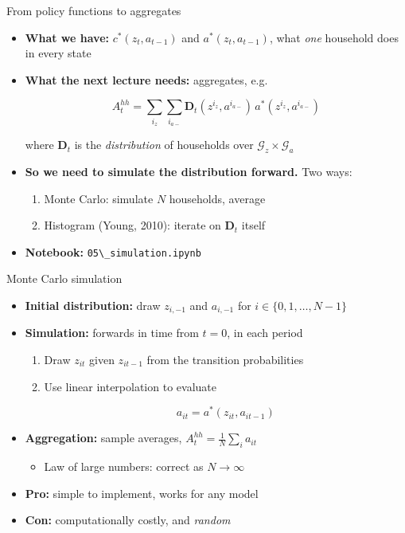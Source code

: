 \documentclass[
  10pt,
  ignorenonframetext,
  aspectratio=43,
  english,
]{beamer}
\providecommand{\tightlist}{%
  \setlength{\itemsep}{0pt}\setlength{\parskip}{0pt}}
\begin{document}
\begin{frame}[fragile]{From policy functions to aggregates}
\protect{}\label{from-policy-functions-to-aggregates}
\begin{itemize}
\item
  \textbf{What we have:} \(c^{\ast}(z_{t},a_{t-1})\) and
  \(a^{\ast}(z_{t},a_{t-1})\), what \emph{one} household does in every
  state
\item
  \textbf{What the next lecture needs:} aggregates, e.g.\vspace{-1mm}

  \[
    A^{hh}_{t}=\sum_{i_{z}}\sum_{i_{a-}}\boldsymbol{D}_{t}(z^{i_{z}},a^{i_{a-}})\,a^{\ast}(z^{i_{z}},a^{i_{a-}})
    \]

  where \(\boldsymbol{D}_{t}\) is the \emph{distribution} of households
  over \(\mathcal{G}_{z}\times\mathcal{G}_{a}\)
\item
  \textbf{So we need to simulate the distribution forward.} Two ways:

  \begin{enumerate}
  \tightlist
  \item
    Monte Carlo: simulate \(N\) households, average
  \item
    Histogram (Young, 2010): iterate on \(\boldsymbol{D}_{t}\) itself
  \end{enumerate}
\item
  \textbf{Notebook:} \texttt{05\textbackslash{}\_simulation.ipynb}
\end{itemize}
\end{frame}

\begin{frame}{Monte Carlo simulation}
\protect{}\label{monte-carlo-simulation}
\begin{itemize}
\tightlist
\item
  \textbf{Initial distribution:} draw \(z_{i,-1}\) and \(a_{i,-1}\) for
  \(i\in\{0,1,\dots,N-1\}\)
\item
  \textbf{Simulation:} forwards in time from \(t=0\), in each period

  \begin{enumerate}
  \item
    Draw \(z_{it}\) given \(z_{it-1}\) from the transition probabilities
  \item
    Use linear interpolation to evaluate\vspace{-1mm}

    \[
     a_{it}=a^{\ast}(z_{it},a_{it-1})
     \]
  \end{enumerate}
\item
  \textbf{Aggregation:} sample averages,
  \(A^{hh}_{t}=\frac{1}{N}\sum_{i}a_{it}\)

  \begin{itemize}
  \tightlist
  \item
    Law of large numbers: correct as \(N\rightarrow\infty\)
  \end{itemize}
\item
  \textbf{Pro:} simple to implement, works for any model
\item
  \textbf{Con:} computationally costly, and \emph{random}
\end{itemize}
\end{frame}
\end{document}
